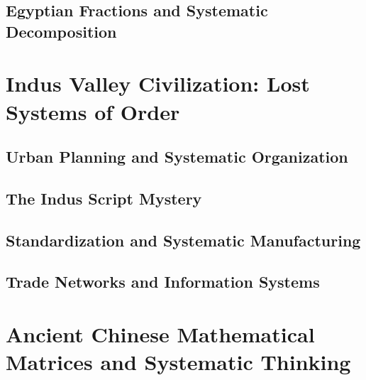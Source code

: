 \documentclass[12pt, oneside, openany]{book}
\begin{document}
\section{Egyptian Fractions and Systematic Decomposition}


\chapter{Indus Valley Civilization: Lost Systems of Order}

\section{Urban Planning and Systematic Organization}

\section{The Indus Script Mystery}

\section{Standardization and Systematic Manufacturing}

\section{Trade Networks and Information Systems}


\chapter{Ancient Chinese Mathematical Matrices and Systematic Thinking}
\end{document}
